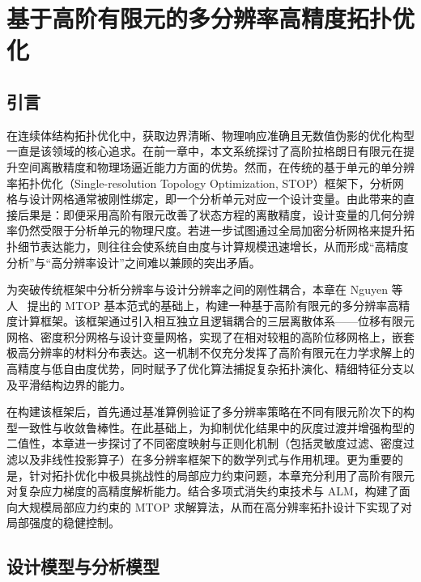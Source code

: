 \chapter{基于高阶有限元的多分辨率高精度拓扑优化}
\label{chap:high_fem_mtop}


\section{引言}
\label{sec:ch4_intro}

在连续体结构拓扑优化中，获取边界清晰、物理响应准确且无数值伪影的优化构型一直是该领域的核心追求。在前一章中，本文系统探讨了高阶拉格朗日有限元在提升空间离散精度和物理场逼近能力方面的优势。然而，在传统的基于单元的单分辨率拓扑优化（Single-resolution Topology Optimization, STOP）框架下，分析网格与设计网格通常被刚性绑定，即一个分析单元对应一个设计变量。由此带来的直接后果是：即便采用高阶有限元改善了状态方程的离散精度，设计变量的几何分辨率仍然受限于分析单元的物理尺度。若进一步试图通过全局加密分析网格来提升拓扑细节表达能力，则往往会使系统自由度与计算规模迅速增长，从而形成“高精度分析”与“高分辨率设计”之间难以兼顾的突出矛盾。

为突破传统框架中分析分辨率与设计分辨率之间的刚性耦合，本章在 Nguyen 等人~\cite{nguyenComputationalParadigmMultiresolution2010a} 提出的 MTOP 基本范式的基础上，构建一种基于高阶有限元的多分辨率高精度计算框架。该框架通过引入相互独立且逻辑耦合的三层离散体系——位移有限元网格、密度积分网格与设计变量网格，实现了在相对较粗的高阶位移网格上，嵌套极高分辨率的材料分布表达。这一机制不仅充分发挥了高阶有限元在力学求解上的高精度与低自由度优势，同时赋予了优化算法捕捉复杂拓扑演化、精细特征分支以及平滑结构边界的能力。

在构建该框架后，首先通过基准算例验证了多分辨率策略在不同有限元阶次下的构型一致性与收敛鲁棒性。在此基础上，为抑制优化结果中的灰度过渡并增强构型的二值性，本章进一步探讨了不同密度映射与正则化机制（包括灵敏度过滤、密度过滤以及非线性投影算子）在多分辨率框架下的数学列式与作用机理。更为重要的是，针对拓扑优化中极具挑战性的局部应力约束问题，本章充分利用了高阶有限元对复杂应力梯度的高精度解析能力。结合多项式消失约束技术与 ALM，构建了面向大规模局部应力约束的 MTOP 求解算法，从而在高分辨率拓扑设计下实现了对局部强度的稳健控制。


\section{设计模型与分析模型}
\label{sec:design_analysis_model}


